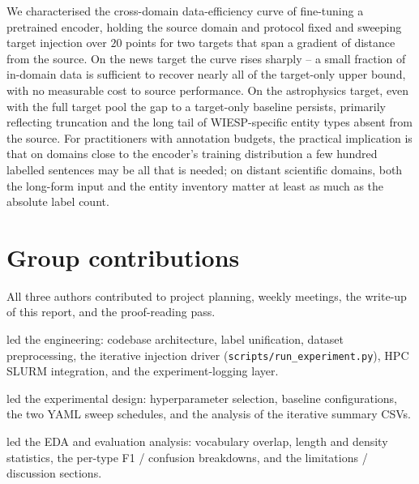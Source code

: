 \documentclass[11pt]{article}
\begin{document}
We characterised the cross-domain data-efficiency curve of fine-tuning a
pretrained encoder, holding the source domain and protocol fixed and
sweeping target injection over $20$ points for two targets that span a
gradient of distance from the source. On the news target the curve rises
sharply -- a small fraction of in-domain data is sufficient to recover
nearly all of the target-only upper bound, with no measurable cost to source
performance. On the astrophysics target, even with the full target pool the
gap to a target-only baseline persists, primarily reflecting truncation and
the long tail of WIESP-specific entity types absent from the source. For
practitioners with annotation budgets, the practical implication is that on
domains close to the encoder's training distribution a few hundred labelled
sentences may be all that is needed; on distant scientific domains, both
the long-form input and the entity inventory matter at least as much as the
absolute label count.



\appendix

\section{Group contributions}
\label{sec:app-contrib}

All three authors contributed to project planning, weekly meetings, the
write-up of this report, and the proof-reading pass.

\begin{description}[leftmargin=0.7em,labelindent=0pt]
  \item[Oliv\'er Istv\'an Gyim\'othy] led the engineering: codebase
    architecture, label unification, dataset preprocessing, the iterative
    injection driver (\texttt{scripts/run\_experiment.py}), HPC SLURM
    integration, and the experiment-logging layer.
  \item[Samuel Joshua Martis] led the experimental design: hyperparameter
    selection, baseline configurations, the two YAML sweep schedules,
    and the analysis of the iterative summary CSVs.
  \item[Rudra Kaushik] led the EDA and evaluation analysis: vocabulary
    overlap, length and density statistics, the per-type F1 / confusion
    breakdowns, and the limitations / discussion sections.
\end{description}
\end{document}

